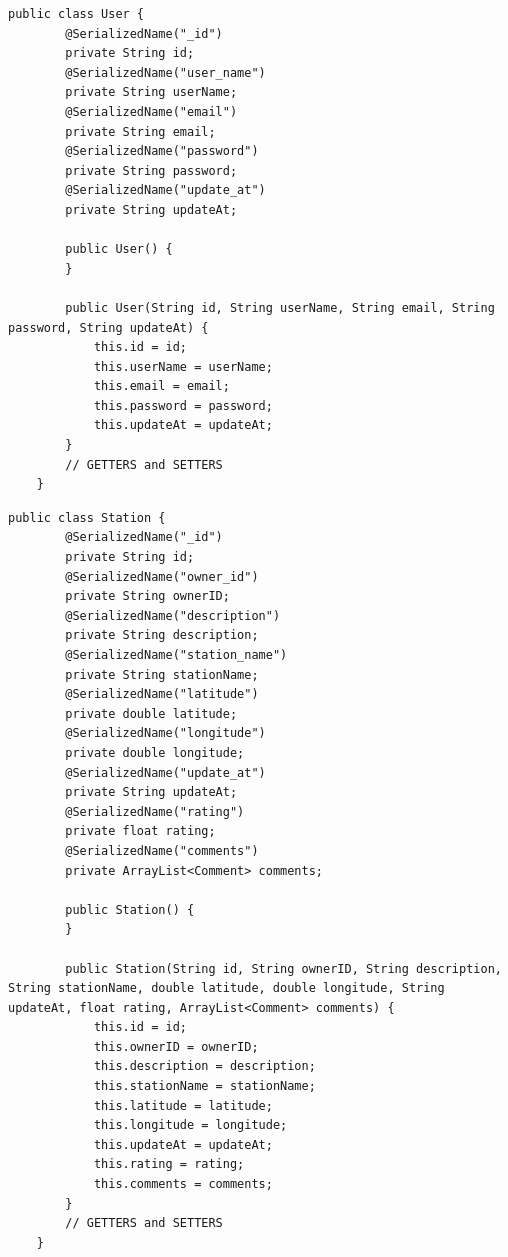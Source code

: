 \begin{lstlisting}[label=list:user_class,caption=Plik \texttt{main/java/com/example/testapp/api/api/UserApi.java},basicstyle=\tiny\ttfamily]
    public class User {
        @SerializedName("_id")
        private String id;
        @SerializedName("user_name")
        private String userName;
        @SerializedName("email")
        private String email;
        @SerializedName("password")
        private String password;
        @SerializedName("update_at")
        private String updateAt;
    
        public User() {
        }
    
        public User(String id, String userName, String email, String password, String updateAt) {
            this.id = id;
            this.userName = userName;
            this.email = email;
            this.password = password;
            this.updateAt = updateAt;
        }
        // GETTERS and SETTERS
    }
\end{lstlisting}

\begin{lstlisting}[label=list:station_class,caption=Plik \texttt{main/java/com/example/testapp/api/api/StationApi.java},basicstyle=\tiny\ttfamily]
    public class Station {
        @SerializedName("_id")
        private String id;
        @SerializedName("owner_id")
        private String ownerID;
        @SerializedName("description")
        private String description;
        @SerializedName("station_name")
        private String stationName;
        @SerializedName("latitude")
        private double latitude;
        @SerializedName("longitude")
        private double longitude;
        @SerializedName("update_at")
        private String updateAt;
        @SerializedName("rating")
        private float rating;
        @SerializedName("comments")
        private ArrayList<Comment> comments;
    
        public Station() {
        }
    
        public Station(String id, String ownerID, String description, String stationName, double latitude, double longitude, String updateAt, float rating, ArrayList<Comment> comments) {
            this.id = id;
            this.ownerID = ownerID;
            this.description = description;
            this.stationName = stationName;
            this.latitude = latitude;
            this.longitude = longitude;
            this.updateAt = updateAt;
            this.rating = rating;
            this.comments = comments;
        }
        // GETTERS and SETTERS
    }
\end{lstlisting}

